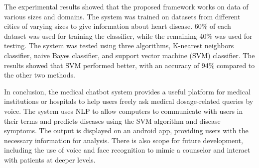 \documentclass[12pt, twoside]{article}
\begin{document}
The experimental results showed that the proposed framework works on data of various sizes and domains. The system was trained on datasets from different cities of varying sizes to give information about heart disease. 60\% of each dataset was used for training the classifier, while the remaining 40\% was used for testing. The system was tested using three algorithms, K-nearest neighbors classifier, naive Bayes classifier, and support vector machine (SVM) classifier. The results showed that SVM performed better, with an accuracy of 94\% compared to the other two methods.

In conclusion, the medical chatbot system provides a useful platform for medical institutions or hospitals to help users freely ask medical dosage-related queries by voice. The system uses NLP to allow computers to communicate with users in their terms and predicts diseases using the SVM algorithm and disease symptoms. The output is displayed on an android app, providing users with the necessary information for analysis. There is also scope for future development, including the use of voice and face recognition to mimic a counselor and interact with patients at deeper levels.
\end{document}
